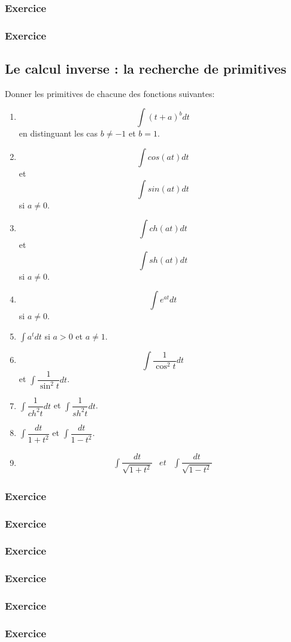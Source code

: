 \documentclass[10pt,a4paper]{article}
\begin{document}
\subsubsection{Exercice}


\subsubsection{Exercice}

\subsection{Le calcul inverse : la recherche de primitives}
Donner les primitives de chacune des fonctions suivantes:
\begin{enumerate}
\item
$$\int (t+a)^b dt$$ en distinguant les cas $b\neq -1$ et $b=1$.
\item
$$\int cos (at) dt $$ et $$\int sin (at) dt $$ si $a\neq 0$.
\item
$$\int ch (at) dt $$ et $$\int sh (at) dt $$ si $a\neq 0$.
\item
$$\int e^{at} dt$$si $a\neq 0$.
\item
$\int a^t dt$ si $a>0$ et $a\neq 1$.
\item
$$\int \dfrac{1}{\cos^2 t} dt $$ et $\int \dfrac{1}{\sin^2 t} dt $.
\item
$\int \dfrac{1}{ch^2 t} dt $ et $\int \dfrac{1}{sh^2 t} dt $.
\item
$\int \dfrac{dt}{1+t^2}$ et $\int \dfrac{dt}{1-t^2}$.
\item
\begin{equation}
\begin{array}{ccc}
\int \dfrac{dt}{\sqrt{1+t^2}} & et & \int \dfrac{dt}{\sqrt{1-t^2}} 
\end{array}
\end{equation}

\end{enumerate}
\subsubsection{Exercice}

\subsubsection{Exercice}

\subsubsection{Exercice}

\subsubsection{Exercice}

\subsubsection{Exercice}

\subsubsection{Exercice}
\end{document}
